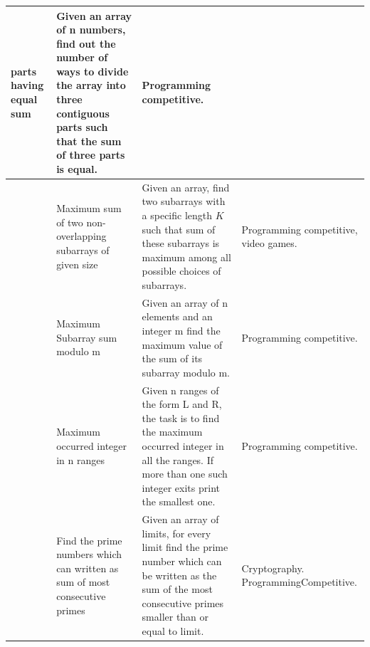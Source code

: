 \documentclass[Ingles]{ic-tese-v1}
\begin{document}
\begin{table}[!t]
\begin{adjustbox}{max width=1.1\textwidth, center}
\begin{tabular}{|>{\centering\arraybackslash}p{0.8cm}|p{5cm}|p{9cm}|p{5cm}|}
			parts having equal sum 
			& Given an array of n numbers, find out the number of ways to
			divide the array into three contiguous parts such that the sum
			of three parts is equal.
			& Programming competitive.\\ \hline
			9   & Maximum sum of two non-overlapping subarrays of given size
			& Given an array, find two subarrays with a specific length $K$
			such that sum of these subarrays is maximum among all possible
			choices of subarrays. 
			& Programming competitive, video games.\\ \hline
			10 & Maximum Subarray sum modulo m
			& Given an array of n elements and an integer m 
			find the maximum value of the sum of its subarray modulo m.
			& Programming competitive.\\ \hline
			11 & Maximum occurred integer in n ranges
			& Given n ranges of the form L and R, the task is to find the
			maximum occurred integer in all the ranges. If more than one
			such integer exits print the smallest one.  
			& Programming competitive.\\ \hline
			12 & Find the prime numbers which can written as sum of most
			consecutive primes
			& Given an array of limits, for every limit find the prime number
			which can be written as the sum of the most consecutive primes
			smaller than or equal to limit. 
			& Cryptography. Programming\newline  Competitive.\\
			\hline
		\end{tabular}
	\end{adjustbox}
	\label{tab:benchmark}
\end{table}
\end{document}
